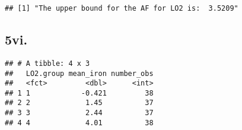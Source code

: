 \documentclass[]{article}
\newenvironment{Shaded}{\begin{snugshade}}{\end{snugshade}}
\newcommand{\CommentTok}[1]{\textcolor[rgb]{0.56,0.35,0.01}{\textit{#1}}}
\newcommand{\DataTypeTok}[1]{\textcolor[rgb]{0.13,0.29,0.53}{#1}}
\newcommand{\KeywordTok}[1]{\textcolor[rgb]{0.13,0.29,0.53}{\textbf{#1}}}
\newcommand{\NormalTok}[1]{#1}
\newcommand{\OperatorTok}[1]{\textcolor[rgb]{0.81,0.36,0.00}{\textbf{#1}}}
\newcommand{\StringTok}[1]{\textcolor[rgb]{0.31,0.60,0.02}{#1}}
\begin{document}
\begin{verbatim}
## [1] "The upper bound for the AF for LO2 is:  3.5209"
\end{verbatim}

\hypertarget{vi.}{%
\subsection{5vi.}\label{vi.}}

\begin{Shaded}
\end{Shaded}

\begin{verbatim}
## # A tibble: 4 x 3
##   LO2.group mean_iron number_obs
##   <fct>         <dbl>      <int>
## 1 1            -0.421         38
## 2 2             1.45          37
## 3 3             2.44          37
## 4 4             4.01          38
\end{verbatim}
\end{document}
